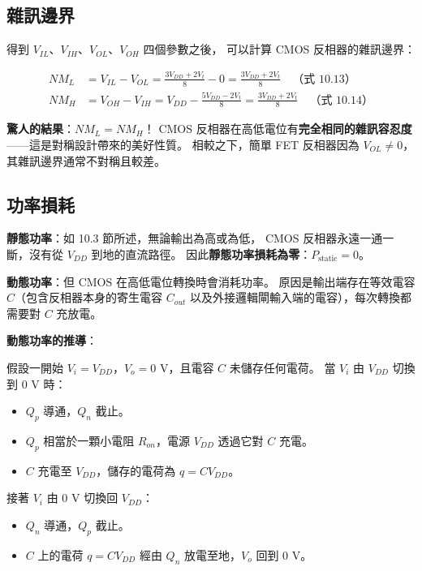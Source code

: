 \documentclass[12pt]{article}
\begin{document}
\subsection*{雜訊邊界}

得到 $V_{IL}$、$V_{IH}$、$V_{OL}$、$V_{OH}$ 四個參數之後，
可以計算 CMOS 反相器的雜訊邊界：

\begin{formulabox}
\begin{align*}
  NM_L &= V_{IL} - V_{OL} = \frac{3V_{DD} + 2V_t}{8} - 0 = \frac{3V_{DD} + 2V_t}{8}
    \quad\text{（式 10.13）} \\[6pt]
  NM_H &= V_{OH} - V_{IH} = V_{DD} - \frac{5V_{DD} - 2V_t}{8} = \frac{3V_{DD} + 2V_t}{8}
    \quad\text{（式 10.14）}
\end{align*}
\end{formulabox}

\textbf{驚人的結果}：$NM_L = NM_H$！
CMOS 反相器在高低電位有\textbf{完全相同的雜訊容忍度}——這是對稱設計帶來的美好性質。
相較之下，簡單 FET 反相器因為 $V_{OL} \neq 0$，其雜訊邊界通常不對稱且較差。

\subsection*{功率損耗}

\begin{keybox}
\textbf{靜態功率}：如 10.3 節所述，無論輸出為高或為低，
CMOS 反相器永遠一通一斷，沒有從 $V_{DD}$ 到地的直流路徑。
因此\textbf{靜態功率損耗為零}：$P_{\text{static}} = 0$。

\medskip
\textbf{動態功率}：但 CMOS 在高低電位轉換時會消耗功率。
原因是輸出端存在等效電容 $C$（包含反相器本身的寄生電容 $C_{out}$
以及外接邏輯閘輸入端的電容），每次轉換都需要對 $C$ 充放電。
\end{keybox}

\textbf{動態功率的推導}：

假設一開始 $V_i = V_{DD}$，$V_o = 0$ V，且電容 $C$ 未儲存任何電荷。
當 $V_i$ 由 $V_{DD}$ 切換到 $0$ V 時：
\begin{itemize}[leftmargin=2.2em,itemsep=2pt]
  \item $Q_p$ 導通，$Q_n$ 截止。
  \item $Q_p$ 相當於一顆小電阻 $R_{on}$，電源 $V_{DD}$ 透過它對 $C$ 充電。
  \item $C$ 充電至 $V_{DD}$，儲存的電荷為 $q = CV_{DD}$。
\end{itemize}

接著 $V_i$ 由 $0$ V 切換回 $V_{DD}$：
\begin{itemize}[leftmargin=2.2em,itemsep=2pt]
  \item $Q_n$ 導通，$Q_p$ 截止。
  \item $C$ 上的電荷 $q = CV_{DD}$ 經由 $Q_n$ 放電至地，$V_o$ 回到 $0$ V。
\end{itemize}
\end{document}
